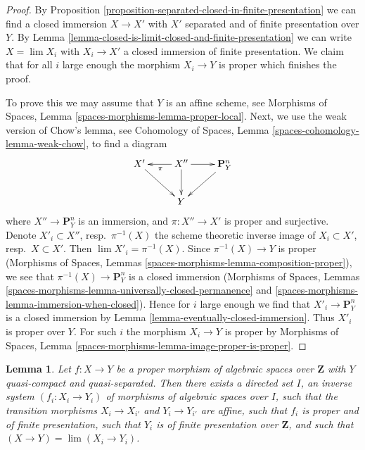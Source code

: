 \documentclass{stacks-project}
\theoremstyle{plain}
\newtheorem{lemma}[subsection]{Lemma}
\theoremstyle{definition}
\theoremstyle{remark}
\numberwithin{equation}{subsection}
\def\lim{\mathop{\mathrm{lim}}\nolimits}
\begin{document}
\begin{proof}
By Proposition \ref{proposition-separated-closed-in-finite-presentation}
we can find a closed immersion $X \to X'$ with $X'$ separated and of
finite presentation over $Y$. By
Lemma \ref{lemma-closed-is-limit-closed-and-finite-presentation}
we can write $X = \lim X_i$ with $X_i \to X'$ a closed immersion of
finite presentation. We claim that for all $i$ large enough
the morphism $X_i \to Y$ is proper which finishes the proof.

\medskip\noindent
To prove this we may assume that $Y$ is an affine scheme, see
Morphisms of Spaces, Lemma \ref{spaces-morphisms-lemma-proper-local}.
Next, we use the weak version of Chow's lemma, see
Cohomology of Spaces, Lemma \ref{spaces-cohomology-lemma-weak-chow},
to find a diagram
$$
\xymatrix{
X' \ar[rd] & X'' \ar[d] \ar[l]^\pi \ar[r] & \mathbf{P}^n_Y \ar[dl] \\
& Y &
}
$$
where $X'' \to \mathbf{P}^n_Y$ is an immersion, and
$\pi : X'' \to X'$ is proper and surjective. Denote
$X'_i \subset X''$, resp.\ $\pi^{-1}(X)$ the scheme theoretic inverse image of
$X_i \subset X'$, resp.\ $X \subset X'$.
Then $\lim X'_i = \pi^{-1}(X)$. Since $\pi^{-1}(X) \to Y$ is proper
(Morphisms of Spaces, Lemmas \ref{spaces-morphisms-lemma-composition-proper}),
we see that $\pi^{-1}(X) \to \mathbf{P}^n_Y$ is a closed immersion
(Morphisms of Spaces, Lemmas
\ref{spaces-morphisms-lemma-universally-closed-permanence} and
\ref{spaces-morphisms-lemma-immersion-when-closed}).
Hence for $i$ large enough
we find that $X'_i \to \mathbf{P}^n_Y$ is a closed immersion by
Lemma \ref{lemma-eventually-closed-immersion}.
Thus $X'_i$ is proper over $Y$.
For such $i$ the morphism $X_i \to Y$ is proper by
Morphisms of Spaces, Lemma \ref{spaces-morphisms-lemma-image-proper-is-proper}.
\end{proof}

\begin{lemma}
\label{lemma-proper-limit-of-proper-finite-presentation-noetherian}
Let $f : X \to Y$ be a proper morphism of algebraic spaces over $\mathbf{Z}$
with $Y$ quasi-compact and quasi-separated. Then there exists a directed
set $I$, an inverse system $(f_i : X_i \to Y_i)$ of morphisms of algebraic
spaces over $I$, such that the transition morphisms $X_i \to X_{i'}$
and $Y_i \to Y_{i'}$ are affine, such that $f_i$ is proper and of
finite presentation, such that $Y_i$ is of finite presentation over
$\mathbf{Z}$, and such that $(X \to Y) = \lim (X_i \to Y_i)$.
\end{lemma}
\end{document}
